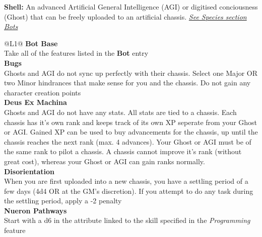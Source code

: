 \begin{enumerate}
  \hline
  
  \textbf{Shell:} An advanced Artificial General Intelligence (AGI) or digitised conciousness (Ghost) that can be freely uploaded to an artificial chassis. \textit{\hyperref[sec:specie-bots]{See Species section Bots}}
  \begin{redtable}{\linewidth}{@{}L{1}@{}}
    \textbf{Bot Base}\\
    Take all of the features listed in the \textbf{Bot} entry\\
    \textbf{Bugs}\\
    Ghosts and AGI do not sync up perfectly with their chassis. Select one Major OR two Minor hindrances that make sense for you and the chassis. Do not gain any character creation points\\
    \textbf{Deus Ex Machina}\\
    Ghosts and AGI do not have any stats. All stats are tied to a chassis. Each chassis has it's own rank and keeps track of its own XP seperate from your Ghost or AGI. Gained XP can be used to buy advancements for the chassis, up until the chassis reaches the next rank (max. 4 advances). Your Ghost or AGI must be of the same rank to pilot a chassis. A chassis cannot improve it's rank (without great cost), whereas your Ghost or AGI can gain ranks normally.\\
    \textbf{Disorientation}\\
    When you are first uploaded into a new chassis, you have a settling period of a few days (4d4 OR at the GM's discretion). If you attempt to do any task during the settling period, apply a -2 penalty\\
    \textbf{Nueron Pathways}\\
    Start with a d6 in the attribute linked to the skill specified in the \textit{Programming} feature\\
  \end{redtable}
  
  \hline
  

\end{enumerate}
